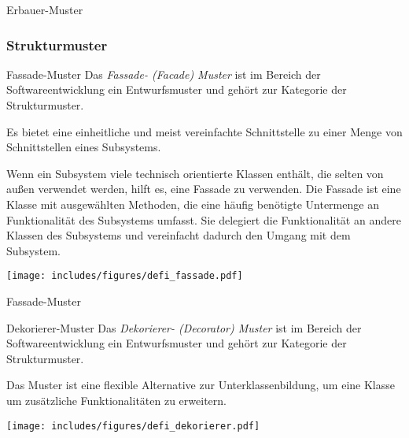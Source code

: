 \begin{example}{Erbauer-Muster}

    

    
\end{example}

\subsubsection{Strukturmuster}

\begin{defi}{Fassade-Muster}
    Das \emph{Fassade- (Facade) Muster} ist im Bereich der Softwareentwicklung ein Entwurfsmuster und gehört zur Kategorie der Strukturmuster.

    Es bietet eine einheitliche und meist vereinfachte Schnittstelle zu einer Menge von Schnittstellen eines Subsystems.

    Wenn ein Subsystem viele technisch orientierte Klassen enthält, die selten von außen verwendet werden, hilft es, eine Fassade zu verwenden. Die Fassade ist eine Klasse mit ausgewählten Methoden, die eine häufig benötigte Untermenge an Funktionalität des Subsystems umfasst. Sie delegiert die Funktionalität an andere Klassen des Subsystems und vereinfacht dadurch den Umgang mit dem Subsystem.

    \begin{center}
        \texttt{[image: includes/figures/defi\_fassade.pdf]}
    \end{center}
\end{defi}

\begin{example}{Fassade-Muster}

    

    

    
\end{example}

\begin{defi}{Dekorierer-Muster}
    Das \emph{Dekorierer- (Decorator) Muster} ist im Bereich der Softwareentwicklung ein Entwurfsmuster und gehört zur Kategorie der Strukturmuster.

    Das Muster ist eine flexible Alternative zur Unterklassenbildung, um eine Klasse um zusätzliche Funktionalitäten zu erweitern.

    \begin{center}
        \texttt{[image: includes/figures/defi\_dekorierer.pdf]}
    \end{center}
\end{defi}


